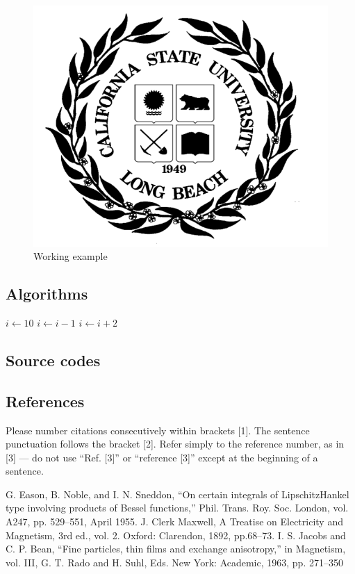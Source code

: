 \documentclass{article}
\begin{document}
\begin{figure}[h]
\begin{center}
\includegraphics[scale=0.35]{csulb logo.png}
\caption{Working example}
\end{center}
\end{figure}

\subsection{Algorithms}
\begin{algorithmic}
    \STATE $i\gets 10$
        \STATE $i\gets i-1$
    \ELSE
            \STATE $i\gets i+2$
        \ENDIF
    \ENDIF
\end{algorithmic}

\subsection{Source codes}



\subsection{References}
Please number citations consecutively within brackets [1]. The sentence punctuation follows the bracket [2]. Refer simply to the reference number, as in [3] — do not use “Ref. [3]” or “reference [3]” except at the beginning of a sentence.

\begin{thebibliography}{}
 G. Eason, B. Noble, and I. N. Sneddon, “On certain integrals of LipschitzHankel type involving products of Bessel functions,” Phil. Trans. Roy. Soc. London, vol. A247, pp. 529–551, April 1955.
 J. Clerk Maxwell, A Treatise on Electricity and Magnetism, 3rd ed., vol. 2. Oxford: Clarendon, 1892, pp.68–73.
  I. S. Jacobs and C. P. Bean, “Fine particles, thin films and exchange anisotropy,” in Magnetism, vol. III, G. T. Rado and H. Suhl, Eds. New York: Academic, 1963, pp. 271–350
\end{thebibliography}
\end{document}
